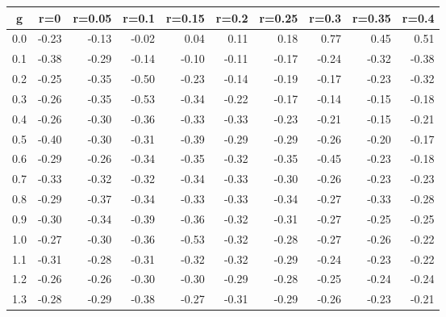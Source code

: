 %
\begin{table}[!tbp]
 \begin{center}
 \begin{tabular}{rrrrrrrrrr}\hline\hline
\multicolumn{1}{c}{g}&\multicolumn{1}{c}{r=0}&\multicolumn{1}{c}{r=0.05}&\multicolumn{1}{c}{r=0.1}&\multicolumn{1}{c}{r=0.15}&\multicolumn{1}{c}{r=0.2}&\multicolumn{1}{c}{r=0.25}&\multicolumn{1}{c}{r=0.3}&\multicolumn{1}{c}{r=0.35}&\multicolumn{1}{c}{r=0.4}\tabularnewline
\hline
0.0&-0.23&-0.13&-0.02& 0.04& 0.11& 0.18& 0.77& 0.45& 0.51\tabularnewline
0.1&-0.38&-0.29&-0.14&-0.10&-0.11&-0.17&-0.24&-0.32&-0.38\tabularnewline
0.2&-0.25&-0.35&-0.50&-0.23&-0.14&-0.19&-0.17&-0.23&-0.32\tabularnewline
0.3&-0.26&-0.35&-0.53&-0.34&-0.22&-0.17&-0.14&-0.15&-0.18\tabularnewline
0.4&-0.26&-0.30&-0.36&-0.33&-0.33&-0.23&-0.21&-0.15&-0.21\tabularnewline
0.5&-0.40&-0.30&-0.31&-0.39&-0.29&-0.29&-0.26&-0.20&-0.17\tabularnewline
0.6&-0.29&-0.26&-0.34&-0.35&-0.32&-0.35&-0.45&-0.23&-0.18\tabularnewline
0.7&-0.33&-0.32&-0.32&-0.34&-0.33&-0.30&-0.26&-0.23&-0.23\tabularnewline
0.8&-0.29&-0.37&-0.34&-0.33&-0.33&-0.34&-0.27&-0.33&-0.28\tabularnewline
0.9&-0.30&-0.34&-0.39&-0.36&-0.32&-0.31&-0.27&-0.25&-0.25\tabularnewline
1.0&-0.27&-0.30&-0.36&-0.53&-0.32&-0.28&-0.27&-0.26&-0.22\tabularnewline
1.1&-0.31&-0.28&-0.31&-0.32&-0.32&-0.29&-0.24&-0.23&-0.22\tabularnewline
1.2&-0.26&-0.26&-0.30&-0.30&-0.29&-0.28&-0.25&-0.24&-0.24\tabularnewline
1.3&-0.28&-0.29&-0.38&-0.27&-0.31&-0.29&-0.26&-0.23&-0.21\tabularnewline
\hline
\end{tabular}

\end{center}

\end{table}

